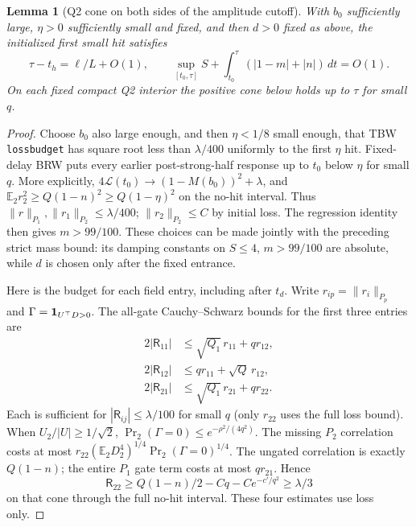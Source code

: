 \documentclass[11pt]{article}
\newtheorem{lemma}{Lemma}
\newcommand{\dt}{\,dt}
\newcommand{\Ll}{\mathcal L}
\newcommand{\E}{\mathbb E}
\begin{document}
\begin{lemma}[Q2 cone on both sides of the amplitude cutoff]\label{an04e5rv1:conelemma}
With $b_0$ sufficiently large, $\eta>0$ sufficiently small and fixed, and then $d>0$ fixed as above, the initialized first small hit satisfies
\begin{equation}\label{an04e5rv1:smallhit}
 \tau-t_h=\ell/L+O(1),\qquad
 \sup_{[t_0,\tau]}S+\int_{t_0}^{\tau}(|1-m|+|n|)\dt=O(1).
\end{equation}
On each fixed compact Q2 interior the positive cone below holds up to $\tau$ for small $q$.
\end{lemma}
\begin{proof}
Choose $b_0$ also large enough, and then $\eta<1/8$ small enough, that TBW \texttt{lossbudget} has square root less than $\lambda/400$ uniformly to the first $\eta$ hit. Fixed-delay BRW puts every earlier post-strong-half response up to $t_0$ below $\eta$ for small $q$. More explicitly, $4\Ll(t_0)\to(1-M(b_0))^2+\lambda$, and $\E_2 r_2^2\ge Q(1-n)^2\ge Q(1-\eta)^2$ on the no-hit interval. Thus
$\|r\|_{P_1},\|r_1\|_{P_2}\le\lambda/400$; $\|r_2\|_{P_2}\le C$ by initial loss. The regression identity then gives $m>99/100$. These choices can be made jointly with the preceding strict mass bound: its damping constants on $S\le4$, $m>99/100$ are absolute, while $d$ is chosen only after the fixed entrance.

Here is the budget for each field entry, including after $t_d$. Write $r_{ip}=\|r_i\|_{P_p}$ and $\Gamma={\bf1}_{U^\top D>0}$. The all-gate Cauchy--Schwarz bounds for the first three entries are
\[
 \begin{aligned}
 2|\mathsf R_{11}|&\le\sqrt{Q_1}\,r_{11}+q r_{12},\\
 2|\mathsf R_{12}|&\le q r_{11}+\sqrt Q\,r_{12},\\
 2|\mathsf R_{21}|&\le\sqrt{Q_1}\,r_{21}+q r_{22}.
 \end{aligned}
\]
Each is sufficient for $|\mathsf R_{ij}|\le\lambda/100$ for small $q$ (only $r_{22}$ uses the full loss bound). When $U_2/|U|\ge1/\sqrt2$, $\Pr_2(\Gamma=0)\le e^{-\rho^2/(4q^2)}$. The missing $P_2$ correlation costs at most $r_{22}(\E_2 D_2^4)^{1/4}\Pr_2(\Gamma=0)^{1/4}$. The ungated correlation is exactly $Q(1-n)$; the entire $P_1$ gate term costs at most $q r_{21}$. Hence
\[
 \mathsf R_{22}\ge Q(1-n)/2-Cq-Ce^{-c'/q^2}\ge\lambda/3
\]
on that cone through the full no-hit interval. These four estimates use loss only.


\end{proof}
\end{document}
